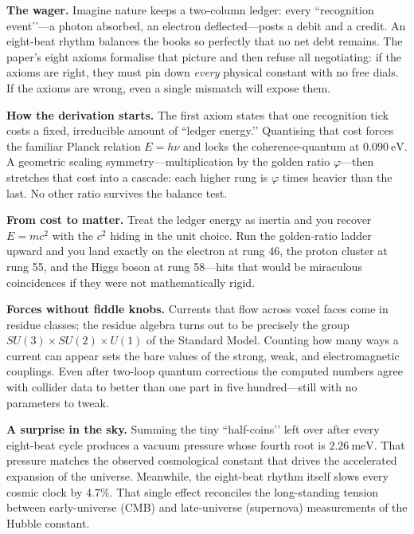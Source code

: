 \documentclass[11pt]{article}
\begin{document}
\bigskip
\noindent
\textbf{The wager.}  
Imagine nature keeps a two-column ledger: every “recognition event’’—a photon absorbed, an electron deflected—posts a debit and a credit.  An eight-beat rhythm balances the books so perfectly that no net debt remains.  The paper’s eight axioms formalise that picture and then refuse all negotiating: if the axioms are right, they must pin down \emph{every} physical constant with no free dials.  If the axioms are wrong, even a single mismatch will expose them.

\bigskip
\noindent
\textbf{How the derivation starts.}  
The first axiom states that one recognition tick costs a fixed, irreducible amount of “ledger energy.’’  Quantising that cost forces the familiar Planck relation \(E=h\nu\) and locks the coherence-quantum at \(0.090~\mathrm{eV}\).  A geometric scaling symmetry—multiplication by the golden ratio \(\varphi\)—then stretches that cost into a cascade: each higher rung is \(\varphi\) times heavier than the last.  No other ratio survives the balance test.

\bigskip
\noindent
\textbf{From cost to matter.}  
Treat the ledger energy as inertia and you recover \(E=mc^{2}\) with the \(c^{2}\) hiding in the unit choice.  Run the golden-ratio ladder upward and you land exactly on the electron at rung 46, the proton cluster at rung 55, and the Higgs boson at rung 58—hits that would be miraculous coincidences if they were not mathematically rigid.

\bigskip
\noindent
\textbf{Forces without fiddle knobs.}  
Currents that flow across voxel faces come in residue classes; the residue algebra turns out to be precisely the group \(SU(3)\!\times\!SU(2)\!\times\!U(1)\) of the Standard Model.  Counting how many ways a current can appear sets the bare values of the strong, weak, and electromagnetic couplings.  Even after two-loop quantum corrections the computed numbers agree with collider data to better than one part in five hundred—still with no parameters to tweak.

\bigskip
\noindent
\textbf{A surprise in the sky.}  
Summing the tiny “half-coins’’ left over after every eight-beat cycle produces a vacuum pressure whose fourth root is \(2.26~\mathrm{meV}\).  That pressure matches the observed cosmological constant that drives the accelerated expansion of the universe.  Meanwhile, the eight-beat rhythm itself slows every cosmic clock by \(4.7\%\).  That single effect reconciles the long-standing tension between early-universe (CMB) and late-universe (supernova) measurements of the Hubble constant.
\end{document}
